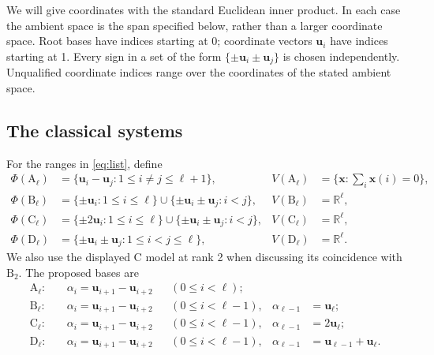 \documentclass[11pt]{amsart}
\newcommand\re{{\mathbb R}}%
\newcommand\Zu{{\mathbf u}}
\newcommand\Zx{{\mathbf x}}
\theoremstyle{definition}
\newcommand{\typ}[1]{\mathrm{#1}}
\begin{document}
We will give coordinates with the standard Euclidean inner product. In
each case the ambient space is the span specified below, rather than a
larger coordinate space. Root bases have indices starting at 0; coordinate
vectors $\Zu_i$ have indices starting at 1. Every sign in a set of the
form $\{\pm\Zu_i\pm\Zu_j\}$ is chosen independently.
Unqualified coordinate indices range over the coordinates of the stated
ambient space.

\subsection{The classical systems}

For the ranges in \eqref{eq:list}, define
\begin{align*}
 \Phi(\typ A_\ell)&=\{\Zu_i-\Zu_j:1\leq i\ne j\leq\ell+1\},
 &V(\typ A_\ell)&=\{\Zx:\textstyle\sum_i\Zx(i)=0\},\\
 \Phi(\typ B_\ell)&=\{\pm\Zu_i:1\leq i\leq\ell\}
             \cup\{\pm\Zu_i\pm\Zu_j:i<j\},
 &V(\typ B_\ell)&=\re^\ell,\\
 \Phi(\typ C_\ell)&=\{\pm2\Zu_i:1\leq i\leq\ell\}
             \cup\{\pm\Zu_i\pm\Zu_j:i<j\},
 &V(\typ C_\ell)&=\re^\ell,\\
 \Phi(\typ D_\ell)&=\{\pm\Zu_i\pm\Zu_j:1\leq i<j\leq\ell\},
 &V(\typ D_\ell)&=\re^\ell.
\end{align*}
We also use the displayed $\typ C$ model at rank 2 when discussing its
coincidence with $\typ B_2$. The proposed bases are
\begin{align}
 \typ A_\ell:\quad&\alpha_i=\Zu_{i+1}-\Zu_{i+2}
                    &&(0\leq i<\ell);\nonumber\\
 \typ B_\ell:\quad&\alpha_i=\Zu_{i+1}-\Zu_{i+2}
                    &&(0\leq i<\ell-1),&\alpha_{\ell-1}&=\Zu_\ell;\nonumber\\
 \typ C_\ell:\quad&\alpha_i=\Zu_{i+1}-\Zu_{i+2}
                    &&(0\leq i<\ell-1),&\alpha_{\ell-1}&=2\Zu_\ell;\nonumber\\
 \typ D_\ell:\quad&\alpha_i=\Zu_{i+1}-\Zu_{i+2}
                    &&(0\leq i<\ell-1),&\alpha_{\ell-1}&=\Zu_{\ell-1}+\Zu_\ell.
 \label{eq:classical-bases}
\end{align}
\end{document}
